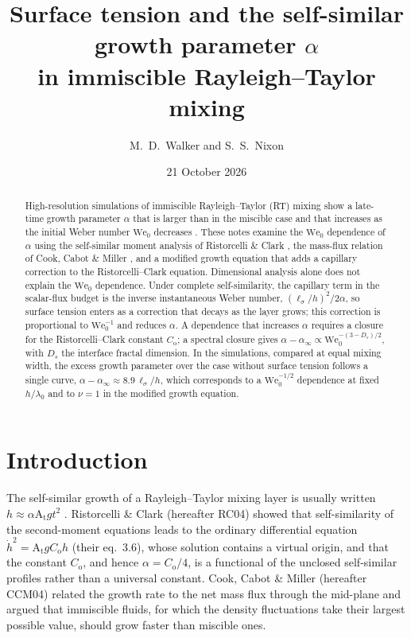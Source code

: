 \documentclass[11pt]{article}
\title{Surface tension and the self-similar growth parameter $\alpha$\\ in immiscible Rayleigh--Taylor mixing}
\author{M.~D.~Walker and S.~S.~Nixon}
\date{21 October 2026}
\numberwithin{equation}{section}
\newcommand{\At}{\mathrm{A_t}}
\newcommand{\We}{\mathrm{We}_0}
\newcommand{\ls}{\ell_\sigma}
\newcommand{\hd}{\dot h}
\begin{document}
\maketitle

\begin{abstract}
High-resolution simulations of immiscible Rayleigh--Taylor (RT) mixing show a late-time growth parameter $\alpha$ that is larger than in the miscible case and that increases as the initial Weber number $\We$ decreases \cite{Walker2025,Walker2026,Walker2027_1}. These notes examine the $\We$ dependence of $\alpha$ using the self-similar moment analysis of Ristorcelli \& Clark \cite{Ristorcelli2004}, the mass-flux relation of Cook, Cabot \& Miller \cite{Cook2004}, and a modified growth equation that adds a capillary correction to the Ristorcelli--Clark equation. Dimensional analysis alone does not explain the $\We$ dependence. Under complete self-similarity, the capillary term in the scalar-flux budget is the inverse instantaneous Weber number, $(\ls/h)^2/2 \alpha$, so surface tension enters as a correction that decays as the layer grows; this correction is proportional to $\We^{-1}$ and reduces $\alpha$. A dependence that increases $\alpha$ requires a closure for the Ristorcelli--Clark constant $C_\mathrm{o}$; a spectral closure gives $\alpha - \alpha_\infty \propto \We^{-(3 - D_s)/2}$, with $D_s$ the interface fractal dimension. In the simulations, compared at equal mixing width, the excess growth parameter over the case without surface tension follows a single curve, $\alpha - \alpha_\infty \approx 8.9 \, \ls/h$, which corresponds to a $\We^{-1/2}$ dependence at fixed $h/\lambda_0$ and to $\nu = 1$ in the modified growth equation.
\end{abstract}

\tableofcontents

\section{Introduction}\label{sec:intro}

The self-similar growth of a Rayleigh--Taylor mixing layer is usually written $h \approx \alpha \At g t^2$ \cite{Youngs1984,Dimonte2004}. Ristorcelli \& Clark \cite{Ristorcelli2004} (hereafter RC04) showed that self-similarity of the second-moment equations leads to the ordinary differential equation $\hd^2 = \At g C_\mathrm{o} h$ (their eq.~3.6), whose solution contains a virtual origin, and that the constant $C_\mathrm{o}$, and hence $\alpha = C_\mathrm{o}/4$, is a functional of the unclosed self-similar profiles rather than a universal constant. Cook, Cabot \& Miller \cite{Cook2004} (hereafter CCM04) related the growth rate to the net mass flux through the mid-plane and argued that immiscible fluids, for which the density fluctuations take their largest possible value, should grow faster than miscible ones.
\end{document}
